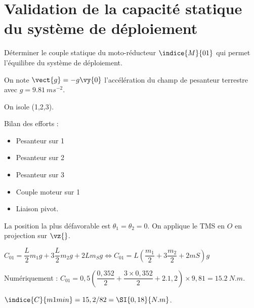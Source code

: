 \section{Validation de la capacité statique du système de déploiement}

\begin{obj}
Déterminer le couple statique du moto-réducteur $\indice{M}{01}$ qui permet l’équilibre du système de déploiement.
\end{obj}

On note $\vect{g} = - g \vy{0}$ l'accélération du champ de pesanteur terrestre avec $g = \SI{9,81}{ms^{-2}}$.

\ifprof
\begin{corrige}%
On isole (1,2,3).

Bilan des efforts : 
\begin{itemize}
\item Pesanteur sur  1 
\item Pesanteur sur 2
\item Pesanteur sur 3
\item Couple moteur sur 1
\item Liaison pivot. 

\end{itemize}

La position la plus défavorable est $\theta_1=\theta_2=0$.
On applique le TMS en $O$ en projection sur $\vz{}$.

$C_{01}=\dfrac{L}{2} m_1g+3\dfrac{L}{2} m_2g+2Lm_Sg \Leftrightarrow C_{01}=L\left(\dfrac{m_1}{2}+3\dfrac{m_2}{2}+2mS\right)g$

Numériquement :
$C_{01}=0,5\left(\dfrac{0,352}{2}+\dfrac{3\times 0,352}{2}+2.1,2\right) \times 9,81=\SI{15,2}{N.m}$.

\end{corrige}
\else
\fi


\ifprof
\begin{corrige}%
$\indice{C}{m1 min}= 15,2/82 = \SI{0,18}{N.m}$.
\end{corrige}
\else
\fi
